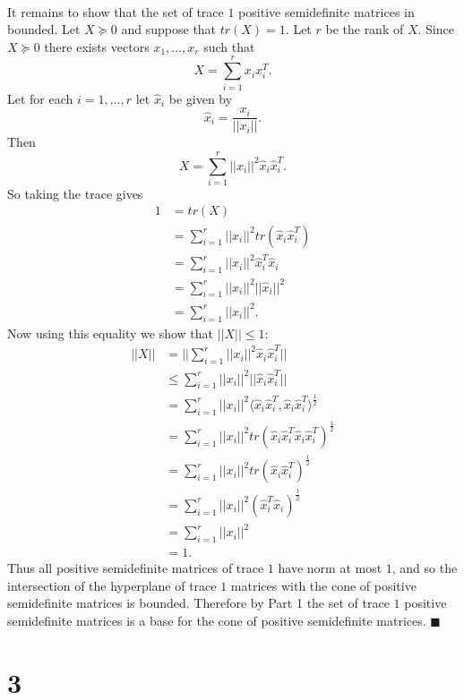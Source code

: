 \documentclass[letterpaper,12pt,oneside,onecolumn]{article}
\begin{document}
\paragraph{}
It remains to show that the set of trace $1$ positive semidefinite matrices in bounded. Let $X\succcurlyeq 0$ and suppose that $tr(X) = 1$. Let $r$ be the rank of $X$. Since $X \succcurlyeq 0$ there exists vectors $x_1, \dots, x_r$ such that
$$ X = \sum_{i=1}^r x_ix_i^T.$$
Let for each $i = 1,\dots,r$ let $\hat{x}_i$ be given by
$$ \hat{x}_i = \frac{x_i}{||x_i||}.$$
Then $$X = \sum_{i=1}^r ||x_i||^2 \hat{x}_i\hat{x}_i^T.$$
So taking the trace gives
\begin{align*}
1 &= tr(X) \\
&= \sum_{i=1}^r ||x_i||^2 tr(\hat{x}_i \hat{x}_i^T) \\
&= \sum_{i=1}^r ||x_i||^2 \hat{x}_i^T \hat{x}_i \\
&= \sum_{i=1}^r ||x_i||^2 ||\hat{x}_i||^2 \\
&= \sum_{i=1}^r ||x_i||^2.
\end{align*}
Now using this equality we show that $||X|| \leq 1$:
\begin{align*}
||X|| &= ||\sum_{i=1}^r ||x_i||^2 \hat{x}_i\hat{x}_i^T|| \\
&\leq \sum_{i=1}^r ||x_i||^2 ||\hat{x}_i\hat{x}_i^T|| \\
&= \sum_{i=1}^r ||x_i||^2 \langle \hat{x}_i \hat{x}_i^T, \hat{x}_i \hat{x}_i^T\rangle^{\frac{1}{2}} \\
&= \sum_{i=1}^r ||x_i||^2 tr(\hat{x}_i \hat{x}_i^T\hat{x}_i \hat{x}_i^T)^{\frac{1}{2}} \\
&= \sum_{i=1}^r ||x_i||^2 tr(\hat{x}_i \hat{x}_i^T)^\frac{1}{2} \\
&= \sum_{i=1}^r ||x_i||^2 (\hat{x}_i^T\hat{x}_i) ^\frac{1}{2} \\
&= \sum_{i=1}^r ||x_i||^2 \\
&= 1.
\end{align*}
Thus all positive semidefinite matrices of trace $1$ have norm at most $1$, and so the intersection of the hyperplane of trace $1$ matrices with the cone of positive semidefinite matrices is bounded. Therefore by Part 1 the set of trace $1$ positive semidefinite matrices is a base for the cone of positive semidefinite matrices. $\blacksquare$
\section*{3}
\end{document}
